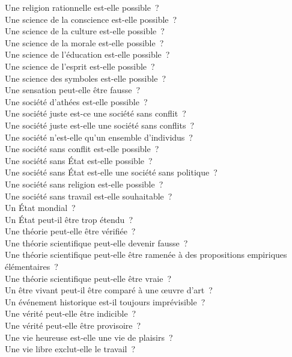 \documentclass[a4paper,12pt]{article}
\begin{document}
Une religion rationnelle est-elle possible ? \\
Une science de la conscience est-elle possible ? \\
Une science de la culture est-elle possible ? \\
Une science de la morale est-elle possible ? \\
Une science de l'éducation est-elle possible ? \\
Une science de l'esprit est-elle possible ? \\
Une science des symboles est-elle possible ? \\
Une sensation peut-elle être fausse ? \\
Une société d'athées est-elle possible ? \\
Une société juste est-ce une société sans conflit ? \\
Une société juste est-elle une société sans conflits ? \\
Une société n'est-elle qu'un ensemble d'individus ? \\
Une société sans conflit est-elle possible ? \\
Une société sans État est-elle possible ? \\
Une société sans État est-elle une société sans politique ? \\
Une société sans religion est-elle possible ? \\
Une société sans travail est-elle souhaitable ? \\
Un État mondial ? \\
Un État peut-il être trop étendu ? \\
Une théorie peut-elle être vérifiée ? \\
Une théorie scientifique peut-elle devenir fausse ? \\
Une théorie scientifique peut-elle être ramenée à des propositions empiriques élémentaires ? \\
Une théorie scientifique peut-elle être vraie ? \\
Un être vivant peut-il être comparé à une œuvre d'art ? \\
Un événement historique est-il toujours imprévisible ? \\
Une vérité peut-elle être indicible ? \\
Une vérité peut-elle être provisoire ? \\
Une vie heureuse est-elle une vie de plaisirs ? \\
Une vie libre exclut-elle le travail ? \\
\end{document}
